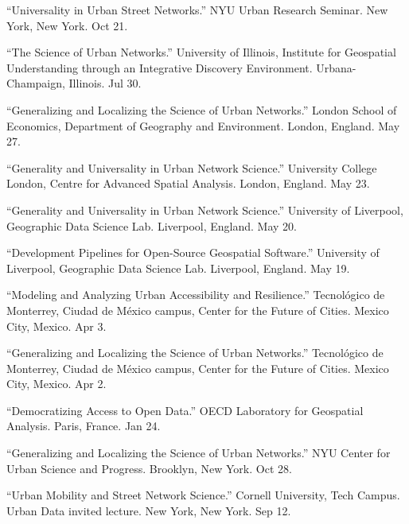 \documentclass[11pt,a4paper]{report} %
\begin{document}
\begin{tablist}
\item[2025] \tab{}\enquote{Universality in Urban Street Networks.} NYU Urban Research Seminar. New York, New York. Oct 21.

\item[2025] \tab{}\enquote{The Science of Urban Networks.} University of Illinois, Institute for Geospatial Understanding through an Integrative Discovery Environment. Urbana-Champaign, Illinois. Jul 30.

\item[2025] \tab{}\enquote{Generalizing and Localizing the Science of Urban Networks.} London School of Economics, Department of Geography and Environment. London, England. May 27.

\item[2025] \tab{}\enquote{Generality and Universality in Urban Network Science.} University College London, Centre for Advanced Spatial Analysis. London, England. May 23.

\item[2025] \tab{}\enquote{Generality and Universality in Urban Network Science.} University of Liverpool, Geographic Data Science Lab. Liverpool, England. May 20.

\item[2025] \tab{}\enquote{Development Pipelines for Open-Source Geospatial Software.} University of Liverpool, Geographic Data Science Lab. Liverpool, England. May 19.

\item[2025] \tab{}\enquote{Modeling and Analyzing Urban Accessibility and Resilience.} Tecnológico de Monterrey, Ciudad de México campus, Center for the Future of Cities. Mexico City, Mexico. Apr 3.

\item[2025] \tab{}\enquote{Generalizing and Localizing the Science of Urban Networks.} Tecnológico de Monterrey, Ciudad de México campus, Center for the Future of Cities. Mexico City, Mexico. Apr 2.

\item[2025] \tab{}\enquote{Democratizing Access to Open Data.} OECD Laboratory for Geospatial Analysis. Paris, France. Jan 24.

\item[2024] \tab{}\enquote{Generalizing and Localizing the Science of Urban Networks.} NYU Center for Urban Science and Progress. Brooklyn, New York. Oct 28.

\item[2024] \tab{}\enquote{Urban Mobility and Street Network Science.} Cornell University, Tech Campus. Urban Data invited lecture. New York, New York. Sep 12.


\end{tablist}
\end{document}
